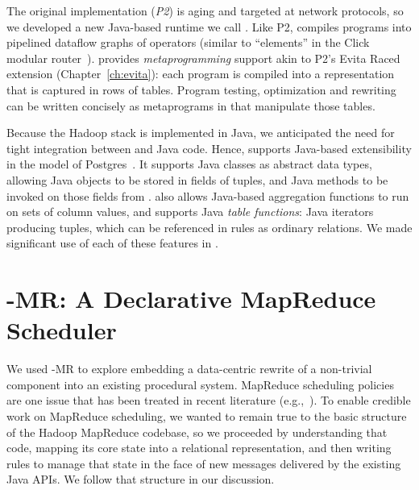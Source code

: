 The original \OVERLOG implementation (\emph{P2}) is aging and targeted at network
protocols, so we developed a new Java-based \OVERLOG runtime we call \emph{\JOL.}
Like P2, \JOL compiles \OVERLOG programs into pipelined dataflow graphs of
operators (similar to ``elements'' in the Click modular router~\cite{click}).
\JOL provides \emph{metaprogramming} support akin to P2's Evita Raced
extension (Chapter~\ref{ch:evita}): each \OVERLOG program is compiled into a
representation that is captured in rows of tables.  Program testing,
optimization and rewriting can be written concisely as metaprograms in \OVERLOG
that manipulate those tables.

Because the Hadoop stack is implemented in Java, we anticipated the need for
tight integration between \OVERLOG and Java code. Hence, \JOL supports Java-based
extensibility in the model of Postgres~\cite{postgres}.  It supports Java
classes as abstract data types, allowing Java objects to be stored in fields of
tuples, and Java methods to be invoked on those fields from \OVERLOG.  \JOL also
allows Java-based aggregation functions to run on sets of column values, and
supports Java \emph{table functions}: Java iterators producing tuples, which can
be referenced in \OVERLOG rules as ordinary relations. We made significant use of
each of these features in \BOOMA.




\section{\BOOM-MR: A Declarative MapReduce Scheduler}
\label{ch:boom:sec:port}

We used \BOOM-MR to explore embedding a data-centric rewrite of a non-trivial 
component into an existing procedural system.  MapReduce scheduling policies are 
one issue that has been treated in recent literature (e.g.,~\cite{late-sched,delay-sched}).  
To enable credible work on MapReduce scheduling, we wanted to remain true to the basic 
structure of the Hadoop MapReduce codebase, so we proceeded by understanding that code,
mapping its core state into a relational representation, and then writing
\OVERLOG rules to manage that state in the face of new messages delivered by the
existing Java APIs.  We follow that structure in our discussion.

